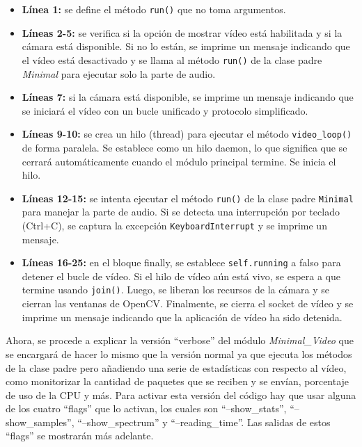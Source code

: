 \begin{itemize}
    \item \textbf{Línea 1:} se define el método \texttt{run()} que no toma argumentos.
    \item \textbf{Líneas 2-5:} se verifica si la opción de mostrar vídeo está habilitada y si la cámara está disponible. Si no lo están, se imprime un mensaje indicando que el vídeo está desactivado y se llama al método \texttt{run()} de la clase padre \textit{Minimal} para ejecutar solo la parte de audio.
    \item \textbf{Líneas 7:} si la cámara está disponible, se imprime un mensaje indicando que se iniciará el vídeo con un bucle unificado y protocolo simplificado.
    \item \textbf{Líneas 9-10:} se crea un hilo (thread) para ejecutar el método \texttt{video\_loop()} de forma paralela. Se establece como un hilo daemon, lo que significa que se cerrará automáticamente cuando el módulo principal termine. Se inicia el hilo.
    \item \textbf{Líneas 12-15:} se intenta ejecutar el método \texttt{run()} de la clase padre \texttt{Minimal} para manejar la parte de audio. Si se detecta una interrupción por teclado (Ctrl+C), se captura la excepción \texttt{KeyboardInterrupt} y se imprime un mensaje.
    \item \textbf{Líneas 16-25:} en el bloque finally, se establece \texttt{self.running} a falso para detener el bucle de vídeo. Si el hilo de vídeo aún está vivo, se espera a que termine usando \texttt{join()}. Luego, se liberan los recursos de la cámara y se cierran las ventanas de OpenCV. Finalmente, se cierra el socket de vídeo y se imprime un mensaje indicando que la aplicación de vídeo ha sido detenida.
\end{itemize}

\vspace{\baselineskip}

Ahora, se procede a explicar la versión ``verbose'' del módulo \textit{Minimal\_Video} que se encargará de hacer lo mismo que la versión normal ya que ejecuta los métodos de la clase padre pero añadiendo una serie de estadísticas con respecto al vídeo, como monitorizar la cantidad de paquetes que se reciben y se envían, porcentaje de uso de la CPU y más. Para activar esta versión del código hay que usar alguna de los cuatro ``flags'' que lo activan, los cuales son ``--show\_stats'', ``--show\_samples'', ``--show\_spectrum'' y ``--reading\_time''. Las salidas de estos ``flags'' se mostrarán más adelante. 
\vspace{\baselineskip}

